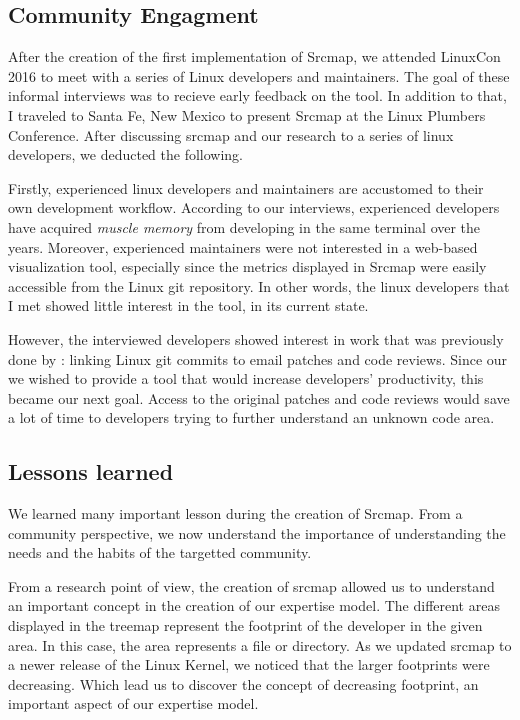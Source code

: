 \subsection{Community Engagment}

After the creation of the first implementation of Srcmap, we attended LinuxCon 2016 to meet with a series of Linux developers and maintainers. The goal of these informal interviews was to recieve early feedback on the tool. In addition to that, I traveled to Santa Fe, New Mexico to present Srcmap at the Linux Plumbers Conference. After discussing srcmap and our research to a series of linux developers, we deducted the following. 

Firstly, experienced linux developers and maintainers are accustomed to their own development workflow. According to our interviews, experienced developers have acquired \textit{muscle memory} from developing in the same terminal over the years. Moreover, experienced maintainers were not interested in a web-based visualization tool, especially since the metrics displayed in Srcmap were easily accessible from the Linux git repository. In other words, the linux developers that I met showed little interest in the tool, in its current state.

However, the interviewed developers showed interest in work that was previously done by \cite{jiang14}: linking Linux git commits to email patches and code reviews. Since our we wished to provide a tool that would increase developers' productivity, this became our next goal. Access to the original patches and code reviews would save a lot of time to developers trying to further understand an unknown code area. 



\subsection{Lessons learned}
\label{sec:lessons_srcmap}

We learned many important lesson during the creation of Srcmap.  From a community perspective, we now understand the importance of understanding the needs and the habits of the targetted community. 


From a research point of view, the creation of srcmap allowed us to understand an important concept in the creation of our expertise model. The different areas displayed in the treemap represent the footprint of the developer in the given area. In this case, the area represents a file or directory. As we updated srcmap to a newer release of the Linux Kernel, we noticed that the larger footprints were decreasing. Which lead us to discover the concept of decreasing footprint, an important aspect of our expertise model. 


